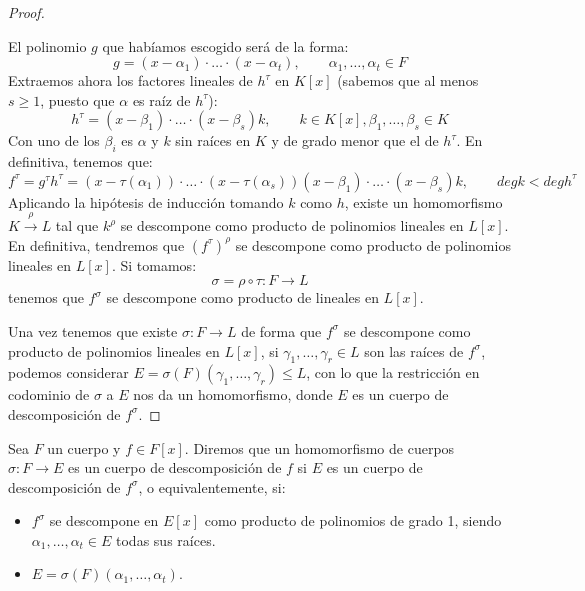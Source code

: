 \begin{prop}
\begin{proof}
\begin{itemize}
                El polinomio $g$ que habíamos escogido será de la forma:
                \begin{equation*}
                    g = (x-\alpha_1)\cdot  \ldots \cdot (x-\alpha_t), \qquad \alpha_1,\ldots,\alpha_t \in F
                \end{equation*}
                Extraemos ahora los factores lineales de $h^\tau$ en $K[x]$ (sabemos que al menos $s\geq 1$, puesto que $\alpha$ es raíz de $h^\tau$):
                \begin{equation*}
                    h^\tau = (x-\beta_1)\cdot \ldots\cdot (x-\beta_s)k, \qquad k\in K[x], \beta_1,\ldots,\beta_s\in K
                \end{equation*}
                Con uno de los $\beta_i$ es $\alpha$ y $k$ sin raíces en $K$ y de grado menor que el de $h^\tau$. En definitiva, tenemos que:
                \begin{equation*}
                    f^\tau = g^\tau h^\tau = (x-\tau(\alpha_1))\cdot  \ldots \cdot (x-\tau(\alpha_s))(x-\beta_1) \cdot \ldots \cdot (x-\beta_s)k, \qquad deg k < deg h^\tau
                \end{equation*}
                Aplicando la hipótesis de inducción tomando $k$ como $h$, existe un homomorfismo $K\stackrel{\rho}{\to}L$ tal que $k^\rho$  se descompone como producto de polinomios lineales en $L[x]$. En definitiva, tendremos que ${(f^\tau)}^{\rho}$ se descompone como producto de polinomios lineales en $L[x]$. Si tomamos:
                \begin{equation*}
                    \sigma = \rho\circ \tau : F\to L
                \end{equation*}
                tenemos que $f^\sigma$ se descompone como producto de lineales en $L[x]$.
        \end{itemize}
        Una vez tenemos que existe $\sigma:F\to L$ de forma que $f^\sigma$ se descompone como producto de polinomios lineales en $L[x]$, si $\gamma_1,\ldots,\gamma_r\in L$ son las raíces de $f^\sigma$, podemos considerar $E=\sigma(F)(\gamma_1,\ldots,\gamma_r)\leq L$, con lo que la restricción en codominio de $\sigma$ a $E$ nos da un homomorfismo, donde $E$ es un cuerpo de descomposición de $f^\sigma$.
    \end{proof}
\end{prop}

\begin{definicion}
    Sea $F$ un cuerpo y $f\in F[x]$. Diremos que un homomorfismo de cuerpos ${\sigma:F\to E}$ es un cuerpo de descomposición de $f$ si $E$ es un cuerpo de descomposición de $f^\sigma$, o equivalentemente, si:
    \begin{itemize}
        \item $f^\sigma$ se descompone en $E[x]$ como producto de polinomios de grado 1, siendo $\alpha_1, \ldots, \alpha_t\in E$ todas sus raíces.
        \item $E = \sigma(F)(\alpha_1,\ldots,\alpha_t)$.
    \end{itemize}
\end{definicion}

